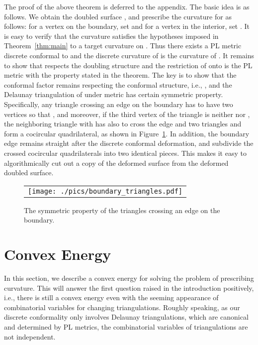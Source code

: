 \documentclass[11pt]{article}
\begin{document}
The proof of the above theorem is deferred to the appendix. The basic idea is as follows. 
We obtain the doubled surface , and prescribe the curvature  for  as 
follows: for a vertex  on the boundary, set  
and for a vertex in the interior, set . 
It is easy to verify that the curvature  satisfies the hypotheses imposed in Theorem~\ref{thm:main}
to a target curvature on . Thus there exists a PL metric  discrete
conformal to  and the discrete curvature of  is the curvature of .
It remains to show that  respects the doubling structure and the restriction of  onto
 is the PL metric  with the property stated in the theorem. The key is to show that the conformal 
factor  remains respecting the conformal structure, i.e., , and the Delaunay triangulation 
of  under metric  has certain symmetric property. Specifically, 
any triangle  crossing an edge  on the boundary has to
have two vertices  so that , and moreover, if the third vertex  of the 
triangle  is neither  nor , the neighboring triangle  with  has also to cross
the edge  and two triangles  and  form a cocircular quadrilateral, as shown in Figure~\ref{fig:boundary_triangles}. 
In addition, the boundary edge  remains straight after the discrete conformal deformation, 
and subdivide the crossed cocircular quadrilaterals into two identical pieces. This makes it easy 
to algorithmically cut out a copy of the deformed surface from the deformed doubled surface. 

\begin{figure}[t]
\begin{center}
\begin{tabular}{c}
\texttt{[image: ./pics/boundary\_triangles.pdf]}
\end{tabular}
\end{center}
\vspace{-0.1in}
\caption{The symmetric property of the triangles crossing an edge 
on the boundary.
\label{fig:boundary_triangles}}
\end{figure}



\section{Convex Energy}
\label{sec:convexenergy}
In this section, we describe a convex energy for solving the problem of prescribing curvature.  
This will answer the first question raised in the introduction positively, i.e.,  there is
still a convex energy even with the seeming appearance of combinatorial variables for changing 
triangulations. Roughly speaking, as our discrete conformality only involves Delaunay
triangulations, which are canonical and determined by PL metrics, the combinatorial variables
of triangulations are not independent. 
\end{document}
